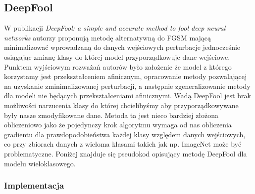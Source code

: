 \documentclass{article}
\begin{document}
\subsection{DeepFool}
W publikacji \textit{DeepFool: a simple and accurate method to fool deep neural networks}\cite{DBLP:journals/corr/Moosavi-Dezfooli15}
autorzy proponują metodę alternatywną do FGSM mającą minimalizować wprowadzaną do danych wejściowych perturbacje jednocześnie
osiągając zmianę klasy do której model przyporządkowuje dane wejściowe. Punktem wyjściowym rozważań autorów było założenie
że model z którego korzystamy jest przekształceniem afinicznym, opracowanie metody pozwalającej na
uzyskanie zminimalizowanej perturbacji, a następnie zgeneralizowanie metody dla modeli nie będących przekształceniami afinicznymi.
Wadą DeepFool jest brak możliwości narzucenia klasy do której chcielibyśmy aby przyporządkowywane były nasze zmodyfikowane dane.
Metoda ta jest nieco bardziej złożona obliczeniowo jako że pojedynczy krok algorytmu wymaga od nas obliczenia gradientu dla
prawdopodobieństwa każdej klasy względem danych wejściowych, co przy zbiorach danych z wieloma klasami
takich jak np. ImageNet może być problematyczne. Poniżej znajduje się pseudokod opisujący metodę DeepFool dla modelu
wieloklasowego.

\subsubsection{Implementacja}
\end{document}
